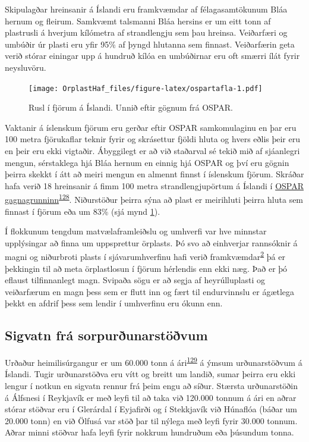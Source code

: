 \documentclass[icelandic,]{book}
\begin{document}
Skipulagðar hreinsanir á Íslandi eru framkvæmdar af félagasamtökunum Bláa hernum og fleirum. Samkvæmt talsmanni Bláa hersins er um eitt tonn af plastrusli á hverjum kílómetra af strandlengju sem þau hreinsa. Veiðarfæri og umbúðir úr plasti eru yfir 95\% af þyngd hlutanna sem finnast. Veiðarfærin geta verið stórar einingar upp á hundruð kílóa en umbúðirnar eru oft smærri ílát fyrir neysluvöru.

\begin{figure}
\centering
\texttt{[image: OrplastHaf\_files/figure-latex/ospartafla-1.pdf]}
\caption{\label{fig:ospartafla}Rusl í fjörum á Íslandi. Unnið eftir gögnum frá OSPAR.}
\end{figure}

Vaktanir á íslenskum fjörum eru gerðar eftir OSPAR samkomulaginu en þar eru 100 metra fjörukaflar teknir fyrir og skrásettur fjöldi hluta og hvers eðlis þeir eru en þeir eru ekki vigtaðir. Ábyggilegt er að við staðarval sé tekið mið af sjáanlegri mengun, sérstaklega hjá Bláa hernum en einnig hjá OSPAR og því eru gögnin þeirra skekkt í átt að meiri mengun en almennt finnst í íslenskum fjörum. Skráðar hafa verið 18 hreinsanir á fimm 100 metra strandlengjupörtum á Íslandi í \href{http://www.mcsuk.org/ospar/map}{OSPAR gagnagrunninn}\textsuperscript{\protect\hyperlink{ref-ospar2019}{128}}. Niðurstöður þeirra sýna að plast er meirihluti þeirra hluta sem finnast í fjörum eða um 83\% (sjá mynd \ref{fig:ospartafla}).

Í flokkunum tengdum matvælaframleiðslu og umhverfi var hve minnstar upplýsingar að finna um uppsprettur örplasts. Þó svo að einhverjar rannsóknir á magni og niðurbroti plasts í sjávarumhverfinu hafi verið framkvæmdar\textsuperscript{\protect\hyperlink{ref-Andrady2017}{2}} þá er þekkingin til að meta örplastlosun í fjörum hérlendis enn ekki næg. Það er þó eflaust tilfinnanlegt magn. Svipaða sögu er að segja af heyrúlluplasti og veiðarfærum en magn þess sem er flutt inn og fært til endurvinnslu er ágætlega þekkt en afdrif þess sem lendir í umhverfinu eru ókunn enn.

\hypertarget{sigvatn-fra-sorpurunarstovum}{%
\subsection*{Sigvatn frá sorpurðunarstöðvum}\label{sigvatn-fra-sorpurunarstovum}}

Urðaður heimilisúrgangur er um 60.000 tonn á ári\textsuperscript{\protect\hyperlink{ref-tollurinn2}{129}} á ýmsum urðunarstöðvum á Íslandi. Tugir urðunarstöðva eru vítt og breitt um landið, sumar þeirra eru ekki lengur í notkun en sigvatn rennur frá þeim engu að síður. Stærsta urðunarstöðin á Álfsnesi í Reykjavík er með leyfi til að taka við 120.000 tonnum á ári en aðrar stórar stöðvar eru í Glerárdal í Eyjafirði og í Stekkjavík við Húnaflóa (báðar um 20.000 tonn) en við Ölfusá var stöð þar til nýlega með leyfi fyrir 30.000 tonnum. Aðrar minni stöðvar hafa leyfi fyrir nokkrum hundruðum eða þúsundum tonna.
\end{document}

